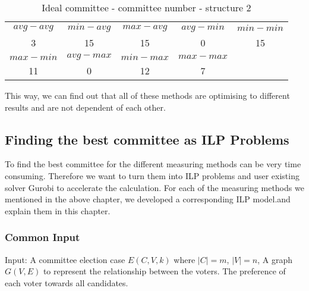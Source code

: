 \documentclass{article}
\begin{document}
    \begin{table}[h]
    \caption{Ideal committee - committee number - structure 2}
        \centering
        \begin{tabular}{ccccc}
             $avg-avg$&  $min-avg$&  $max-avg$&  $avg-min$& $min-min$\\
             3&  15&  15&  0& 15\\
             $max-min$&  $avg-max$&  $min-max$&  $max-max$& \\
             11&  0&  12&  7& \\
        \end{tabular}
     
        \label{tab:res_table_2}
    \end{table}    

This way, we can find out that all of these methods are optimising to different results and are not dependent of each other.


\subsection{Finding the best committee as ILP Problems}

To find the best committee for the different measuring methods can be very time consuming. Therefore we want to turn them into ILP problems and user existing solver Gurobi to accelerate the calculation. For each of the measuring methods we mentioned in the above chapter, we developed a corresponding ILP model.and explain them in this chapter.

\subsubsection*{Common Input}
Input: A committee election case $E (C,V,k)$ where $\vert C \vert =m $, $\vert V \vert =n$, A graph $G(V,E)$ to represent the relationship between the voters. The preference of each voter towards all candidates.
\end{document}
